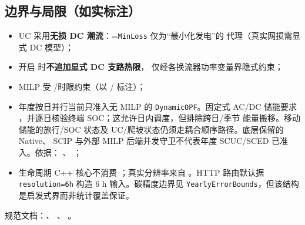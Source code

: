 \documentclass[UTF8,fontset=fandol,a4paper,11pt]{ctexart}
\begin{document}
\subsection{边界与局限（如实标注）}
\begin{itemize}
  \item UC 采用\textbf{无损 DC 潮流}：=\texttt{MinLoss} 仅为“最小化发电”的
        代理（真实网损需显式 DC 模型）；
  \item 开启  时\textbf{不追加显式 DC 支路热限}，
        仅经各换流器功率变量界隐式约束；
  \item MILP 受 /时限约束（以 / 标注）；
  \item 年度按日并行当前只准入无 MILP 的 \texttt{DynamicOPF}。固定式 AC/DC 储能要求
        ，并逐日核验终端 SOC；这允许日内调度，但排除跨日/季节
        能量搬移。移动储能的旅行/SOC 状态及 UC/爬坡状态仍须走耦合顺序路径。底层保留的 Native、
        SCIP 与外部 MILP 后端并发守卫不代表年度 SCUC/SCED 已准入。依据：
        、
        ；
  \item 生命周期 C++ 核心不消费 ；真实分辨率来自
        。HTTP 路由默认据 \texttt{resolution=6h} 构造
        6 h 输入。碳精度边界见 \texttt{YearlyErrorBounds}，但该结构是启发式界而非统计覆盖保证。
\end{itemize}
规范文档：、
、
。

\end{document}
